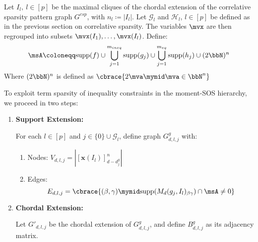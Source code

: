 Let ${I_l}, \ l\in [p]$ be the maximal cliques of the chordal extension of the correlative sparsity pattern graph $G^{csp}$, with $n_l \coloneqq |I_l|$. Let $\mathcal{G}_l$ and $\mathcal{H}_l$, $l\in [p]$ be defined as in the previous section on correlative sparsity. The variables $\mvx$ are then regrouped into subsets $\mvx(I_1), \dots, \mvx(I_l)$. Define:
\begin{align}
	\msA\coloneqq \text{supp}(f)\cup\bigcup_{j = 1}^{m_{ineq}}\text{supp}(g_j)\cup\bigcup_{j = 1}^{m_{eq}}\text{supp}(h_j)\cup (2\bbN)^n
\end{align}
Where $(2\bbN)^n$ is defined as $\cbrace{2\mva \mymid \mva\in \bbN^n}$

To exploit term sparsity of inequality constraints in the moment-SOS hierarchy, we proceed in two steps:

\begin{enumerate}
	\item \textbf{Support Extension: }
	
	For each $l \in [p]$ and $j \in \{0\} \cup \mathcal{G}_l$, define graph $G_{d,l,j}^g$ with:
	\begin{enumerate}
		\item Nodes: $V_{d,l,j} = |[\mathbf{x}(I_l)]_{d-d_j^g}^n|$
		\item Edges: 
		\begin{equation*}
			E_{d,l,j} = \cbrace{(\beta, \gamma)\mymid \text{supp}( M_d(g_j, I_l)_{\beta\gamma})\cap \msA \ne 0}
		\end{equation*}
	\end{enumerate}

	\item \textbf{Chordal Extension: } 
	
	Let $G'_{d,l,j}$ be the chordal extension of $G_{d,l,j}^g$, and define $B_{d,l,j}^g$ as its adjacency matrix.
\end{enumerate}

